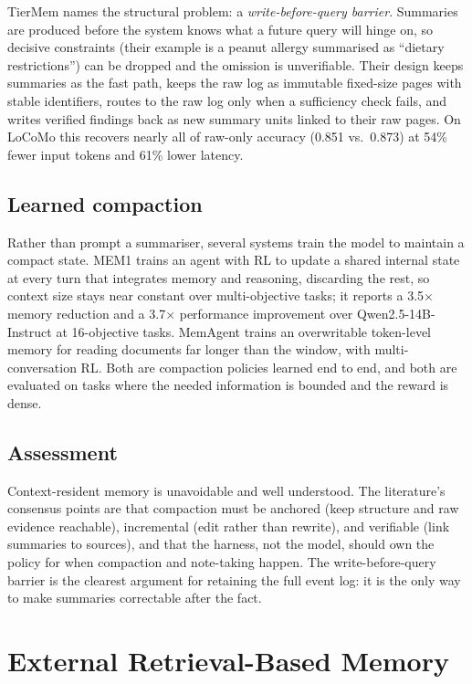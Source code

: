 \documentclass[11pt]{article}
\begin{document}
TierMem \citep{zhu2026tiermem} names the structural problem: a \emph{write-before-query barrier}. Summaries are produced before the system knows what a future query will hinge on, so decisive constraints (their example is a peanut allergy summarised as ``dietary restrictions'') can be dropped and the omission is unverifiable. Their design keeps summaries as the fast path, keeps the raw log as immutable fixed-size pages with stable identifiers, routes to the raw log only when a sufficiency check fails, and writes verified findings back as new summary units linked to their raw pages. On LoCoMo this recovers nearly all of raw-only accuracy (0.851 vs.\ 0.873) at 54\% fewer input tokens and 61\% lower latency.

\subsection{Learned compaction}

Rather than prompt a summariser, several systems train the model to maintain a compact state. MEM1 \citep{zhou2025mem1} trains an agent with RL to update a shared internal state at every turn that integrates memory and reasoning, discarding the rest, so context size stays near constant over multi-objective tasks; it reports a 3.5$\times$ memory reduction and a 3.7$\times$ performance improvement over Qwen2.5-14B-Instruct at 16-objective tasks. MemAgent \citep{yu2025memagent} trains an overwritable token-level memory for reading documents far longer than the window, with multi-conversation RL. Both are compaction policies learned end to end, and both are evaluated on tasks where the needed information is bounded and the reward is dense.

\subsection{Assessment}

Context-resident memory is unavoidable and well understood. The literature's consensus points are that compaction must be anchored (keep structure and raw evidence reachable), incremental (edit rather than rewrite), and verifiable (link summaries to sources), and that the harness, not the model, should own the policy for when compaction and note-taking happen. The write-before-query barrier is the clearest argument for retaining the full event log: it is the only way to make summaries correctable after the fact.

\section{External Retrieval-Based Memory}
\label{sec:retrieval}
\end{document}
